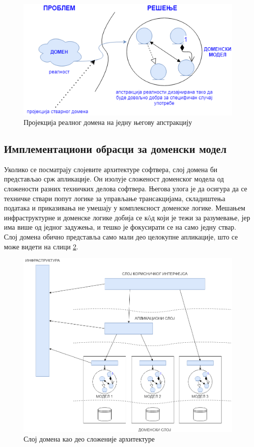 \documentclass[12pt,oneside]{memoir}
\begin{document}
\begin{figure}[!ht]
  \centering
  \includegraphics[scale=0.7]{slike/domen-model-projekcija.png}
  \caption{Пројекција реалног домена на једну његову апстракцију}
  \label{fig:domenmodelprojekcija}
\end{figure}
\subsection{Имплементациони обрасци за доменски модел}
Уколико се посматрају слојевите архитектуре софтвера, слој домена би представљао срж апликације. Он изолује сложеност доменског модела од сложености разних техничких делова софтвера. Његова улога је да осигура да се техничке ствари попут логике за управљање трансакцијама, складиштења података и приказивања не умешају у комплексност доменске логике. Мешањем инфраструктурне и доменске логике добија се кôд који је тежи за разумевање, јер има више од једног задужења, и тешко је фокусирати се на само једну ствар. Слој домена обично представља само мали део целокупне апликације, што се може видети на слици \ref{fig:slojevitaarhitektura}.

\begin{figure}[!ht]
  \centering
  \includegraphics[width=\textwidth]{slike/slojevita-arhitektura.png}
  \caption{Слој домена као део сложеније архитектуре}
  \label{fig:slojevitaarhitektura}
\end{figure}
\end{document}
